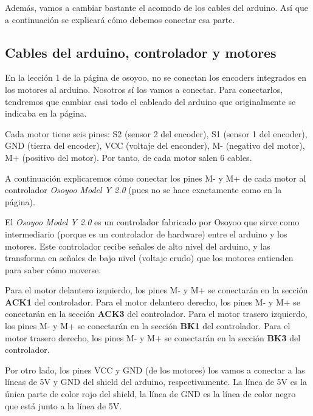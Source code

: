 \documentclass[12pt, letterpaper]{article}
\begin{document}
Además, vamos a cambiar bastante el acomodo de los cables del arduino. Así que a continuación se explicará cómo debemos conectar esa parte. 

\subsection{Cables del arduino, controlador y motores}
En la lección 1 de la página de osoyoo, no se conectan los encoders integrados en los motores al arduino. Nosotros sí los vamos a conectar. Para conectarlos, tendremos que cambiar casi todo el cableado del arduino que originalmente se indicaba en la página. 

Cada motor tiene seis pines: S2 (sensor 2 del encoder), S1 (sensor 1 del encoder), GND (tierra del encoder), VCC (voltaje del enconder), M- (negativo del motor), M+ (positivo del motor). Por tanto, de cada motor salen 6 cables. 

A continuación explicaremos cómo conectar los pines M- y M+ de cada motor al controlador \textit{Osoyoo Model Y 2.0} (pues no se hace exactamente como en la página).


\begin{miencuadre}
    El \textit{Osoyoo Model Y 2.0} es un controlador fabricado por Osoyoo que sirve como intermediario (porque es un controlador de hardware) entre el arduino y los motores. Este controlador recibe señales de alto nivel del arduino, y las transforma en señales de bajo nivel (voltaje crudo) que los motores entienden para saber cómo moverse.     
\end{miencuadre}

Para el motor delantero izquierdo, los pines M- y M+ se conectarán en la sección \textbf{ACK1} del controlador. Para el motor delantero derecho, los pines M- y M+ se conectarán en la sección \textbf{ACK3} del controlador. Para el motor trasero izquierdo, los pines M- y M+ se conectarán en la sección \textbf{BK1} del controlador. Para el motor trasero derecho, los pines M- y M+ se conectarán en la sección \textbf{BK3} del controlador.

Por otro lado, los pines VCC y GND (de los motores) los vamos a conectar a las líneas de 5V y GND del shield del arduino, respectivamente. La línea de 5V es la única parte de color rojo del shield, la línea de GND es la línea de color negro que está junto a la línea de 5V.
\end{document}
